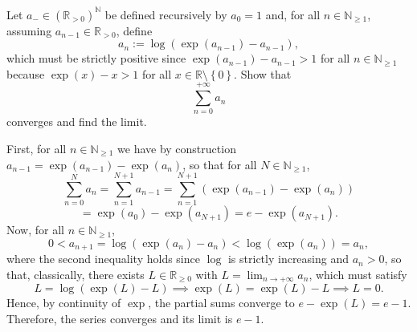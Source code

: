 \begin{problem}
    Let \( a_{-} \in \left(\mathbb{R}_{>0}\right)^{\mathbb{N}} \) be defined recursively by \( a_0 = 1 \) and, for all \( n \in \mathbb{N}_{\geq 1} \), assuming \( a_{n-1} \in \mathbb{R}_{>0} \), define
    \[
        a_n := \log\left(\exp\left(a_{n-1}\right) - a_{n-1}\right),
    \]
    which must be strictly positive since \( \exp\left(a_{n-1}\right) - a_{n-1} > 1 \) for all \( n \in \mathbb{N}_{\geq 1} \) because \( \exp\left(x\right) - x > 1 \) for all \( x \in \mathbb{R} \setminus \left\{0\right\} \). Show that
    \[
        \sum_{n=0}^{+\infty} a_n
    \]
    converges and find the limit.
\end{problem}
\begin{solution}
    First, for all \( n \in \mathbb{N}_{\geq 1} \) we have by construction \( a_{n-1} = \exp\left(a_{n-1}\right) - \exp\left(a_n\right) \), so that for all \( N \in \mathbb{N}_{\geq 1} \),
    \[
        \sum_{n=0}^{N} a_n = \sum_{n=1}^{N+1} a_{n-1} = \sum_{n=1}^{N+1} \left(\exp\left(a_{n-1}\right) - \exp\left(a_n\right)\right)
    \]
    \[
        = \exp\left(a_0\right) - \exp\left(a_{N+1}\right) = e - \exp\left(a_{N+1}\right).
    \]
    Now, for all \( n \in \mathbb{N}_{\geq 1} \),
    \[
        0 < a_{n+1} = \log\left(\exp\left(a_n\right) - a_n\right) < \log\left(\exp\left(a_n\right)\right) = a_n,
    \]
    where the second inequality holds since \( \log \) is strictly increasing and \( a_n > 0 \), so that, classically, there exists \( L \in \mathbb{R}_{\geq 0} \) with \( L = \lim_{n \to +\infty} a_n \), which must satisfy
    \[
        L = \log\left(\exp\left(L\right) - L\right) \implies \exp\left(L\right) = \exp\left(L\right) - L \implies L = 0.
    \]
    Hence, by continuity of \( \exp \), the partial sums converge to \( e - \exp\left(L\right) = e - 1 \). Therefore, the series converges and its limit is \( e - 1 \).
\end{solution}
